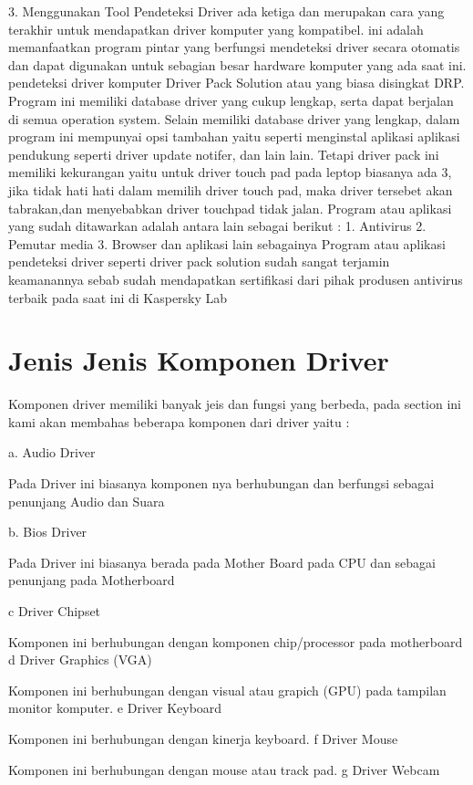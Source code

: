 3. Menggunakan Tool Pendeteksi Driver
ada ketiga dan merupakan cara yang terakhir untuk mendapatkan driver komputer yang kompatibel.
ini adalah memanfaatkan program pintar yang berfungsi mendeteksi driver secara otomatis dan dapat digunakan untuk sebagian besar hardware komputer yang ada saat ini.
pendeteksi driver komputer  Driver Pack Solution atau yang biasa disingkat DRP.
Program ini memiliki database driver yang cukup lengkap, serta dapat berjalan di semua operation system.
Selain memiliki database driver yang lengkap, dalam program ini mempunyai opsi tambahan yaitu seperti menginstal aplikasi aplikasi pendukung seperti driver update notifer, dan lain lain.
Tetapi driver pack ini memiliki kekurangan yaitu untuk driver touch pad pada leptop biasanya ada 3, jika tidak hati hati dalam memilih driver touch pad, maka driver tersebet akan tabrakan,dan menyebabkan driver touchpad tidak jalan.
Program atau aplikasi  yang sudah ditawarkan adalah antara lain sebagai berikut :
1.	Antivirus 
2.	Pemutar media
3.	Browser dan aplikasi lain sebagainya 
Program atau aplikasi pendeteksi driver seperti driver pack solution sudah sangat terjamin keamanannya sebab sudah mendapatkan sertifikasi dari pihak produsen antivirus terbaik pada saat ini di Kaspersky Lab 


\section{Jenis Jenis Komponen Driver}

Komponen driver memiliki banyak jeis dan fungsi yang berbeda, pada section ini kami akan membahas beberapa komponen dari driver yaitu : 

a. Audio Driver

Pada Driver ini biasanya komponen nya berhubungan dan berfungsi sebagai penunjang Audio dan Suara

b. Bios Driver

Pada Driver ini biasanya berada pada Mother Board pada CPU dan sebagai penunjang pada Motherboard

c	Driver Chipset 

 Komponen ini berhubungan dengan komponen chip/processor pada motherboard
d	Driver Graphics (VGA) 

 Komponen ini berhubungan dengan visual atau grapich (GPU) pada tampilan monitor komputer.
e	Driver Keyboard 

 Komponen ini berhubungan dengan kinerja keyboard.
f	Driver Mouse

 Komponen ini berhubungan dengan mouse atau track pad.
g	Driver Webcam 

